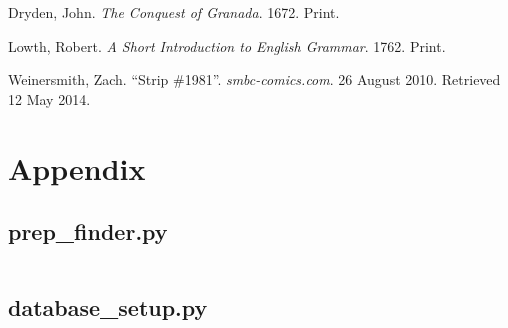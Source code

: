 \documentclass[DIV=calc, paper=letter, fontsize=12pt]{scrartcl}	 %
\begin{document}
\begin{multicols}{2}
\begin{thebibliography}{99}
  Dryden, John. \emph{The Conquest of Granada}. 1672. Print.
 
  Lowth, Robert. \emph{A Short Introduction to English Grammar}. 1762. Print.
 
  Weinersmith, Zach. ``Strip \#1981''. \emph{smbc-comics.com}. 26 August 2010. Retrieved 12 May 2014. 


\end{thebibliography}





\end{multicols}

\pagebreak{}
\section{Appendix}

\subsection{prep\_finder.py}
\inputminted{python}{prep_finder.py}

\subsection{database\_setup.py}
\inputminted{python}{database_setup.py}
\end{document}
